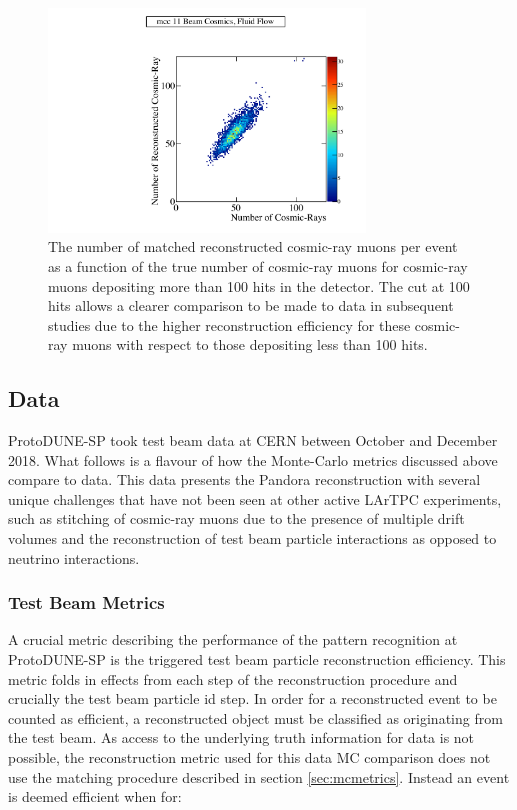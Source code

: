 \begin{figure}
\centering
\includegraphics[width=0.75\textwidth]{Figures/Metrics/MC/Cosmics/CRMatchesCosmicRayEvent.pdf}
\caption{The number of matched reconstructed cosmic-ray muons per event as a function of the true number of cosmic-ray muons for cosmic-ray muons depositing more than 100 hits in the detector.  The cut at 100 hits allows a clearer comparison to be made to data in subsequent studies due to the higher reconstruction efficiency for these cosmic-ray muons with respect to those depositing less than 100 hits.}
\label{fig:crnperevt}
\end{figure}

\subsection{Data}

ProtoDUNE-SP took test beam data at CERN between October and December 2018.  What follows is a flavour of how the Monte-Carlo metrics discussed above compare to data.  This data presents the Pandora reconstruction with several unique challenges that have not been seen at other active LArTPC experiments, such as stitching of cosmic-ray muons due to the presence of multiple drift volumes and the reconstruction of test beam particle interactions as opposed to neutrino interactions.  

\subsubsection{Test Beam Metrics}
A crucial metric describing the performance of the pattern recognition at ProtoDUNE-SP is the triggered test beam particle reconstruction efficiency.  This metric folds in effects from each step of the reconstruction procedure and crucially the test beam particle id step.  In order for a reconstructed event to be counted as efficient, a reconstructed object must be classified as originating from the test beam.  As access to the underlying truth information for data is not possible, the reconstruction metric used for this data MC comparison does not use the matching procedure described in section \ref{sec:mcmetrics}.  Instead an event is deemed efficient when for:

